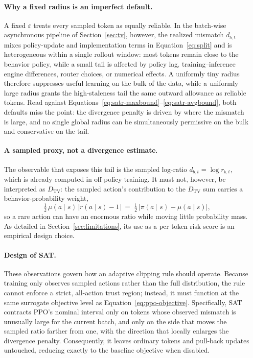 \paragraph{Why a fixed radius is an imperfect default.}
A fixed $\varepsilon$ treats every sampled token as equally reliable. In the batch-wise asynchronous pipeline of Section~\ref{sec:tv}, however, the realized mismatch $d_{b,t}$ mixes policy-update and implementation terms in Equation~\eqref{eq:split} and is heterogeneous within a single rollout window: most tokens remain close to the behavior policy, while a small tail is affected by policy lag, training--inference engine differences, router choices, or numerical effects. A uniformly tiny radius therefore suppresses useful learning on the bulk of the data, while a uniformly large radius grants the high-staleness tail the same outward allowance as reliable tokens. Read against Equations~\eqref{eq:satr-maxbound}--\eqref{eq:satr-avgbound}, both defaults miss the point: the divergence penalty is driven by where the mismatch is large, and no single global radius can be simultaneously permissive on the bulk and conservative on the tail.

\paragraph{A sampled proxy, not a divergence estimate.}
The observable that exposes this tail is the sampled log-ratio $d_{b,t}=\log r_{b,t}$, which is already computed in off-policy training. It must not, however, be interpreted as $D_{\mathrm{TV}}$: the sampled action's contribution to the $D_{\mathrm{TV}}$ sum carries a behavior-probability weight,
\begin{equation}
\tfrac12\,\mu(a\mid s)\,\big|r(a\mid s)-1\big|\;=\;\tfrac12\,\big|\pi(a\mid s)-\mu(a\mid s)\big|,
\label{eq:tv-mass}
\end{equation}
so a rare action can have an enormous ratio while moving little probability mass. As detailed in Section~\ref{sec:limitations}, its use as a per-token risk score is an empirical design choice.

\paragraph{Design of SAT.}
These observations govern how an adaptive clipping rule should operate. Because training only observes sampled actions rather than the full distribution, the rule cannot enforce a strict, all-action trust region; instead, it must function at the same surrogate objective level as Equation~\eqref{eq:ppo-objective}.
Specifically, SAT contracts PPO's nominal interval only on tokens whose observed mismatch is unusually large {for the current batch}, and only on the side that moves the sampled ratio farther from one, with the direction that locally enlarges the divergence penalty. Consequently, it leaves ordinary tokens and pull-back updates untouched, reducing exactly to the baseline objective when disabled.

